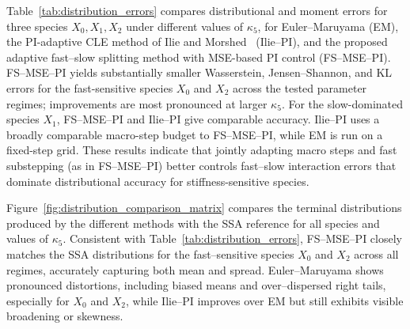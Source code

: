\documentclass{article}
\begin{document}
Table~\ref{tab:distribution_errors} compares distributional and moment
errors for three species \(X_0,X_1,X_2\) under different values of
\(\kappa_5\), for Euler--Maruyama (EM), the PI-adaptive CLE method of Ilie
and Morshed~\cite{ilie2015adaptive} (Ilie--PI), and the proposed adaptive
fast--slow splitting method with MSE-based PI control (FS--MSE--PI). FS--MSE--PI yields substantially smaller Wasserstein, Jensen--Shannon, and KL
errors for the fast-sensitive species \(X_0\) and \(X_2\) across the tested
parameter regimes; improvements are most pronounced at larger \(\kappa_5\).
For the slow-dominated species \(X_1\), FS--MSE--PI and Ilie--PI give
comparable accuracy. Ilie--PI uses a broadly comparable macro-step budget to
FS--MSE--PI, %
while EM is run on a fixed-step grid.
These results indicate that jointly adapting macro steps and fast substepping
(as in FS--MSE--PI) better controls fast–slow interaction errors that dominate distributional accuracy for stiffness-sensitive species.


Figure~\ref{fig:distribution_comparison_matrix} compares the terminal distributions
produced by the different methods with the SSA reference for all species and
values of $\kappa_5$. Consistent with Table~\ref{tab:distribution_errors},
FS--MSE--PI closely matches the SSA distributions for the fast--sensitive species
$X_0$ and $X_2$ across all regimes, accurately capturing both mean and spread.
Euler--Maruyama shows pronounced distortions, including biased means and
over--dispersed right tails, especially for $X_0$ and $X_2$, while Ilie--PI
improves over EM but still exhibits visible broadening or skewness.

\end{document}
